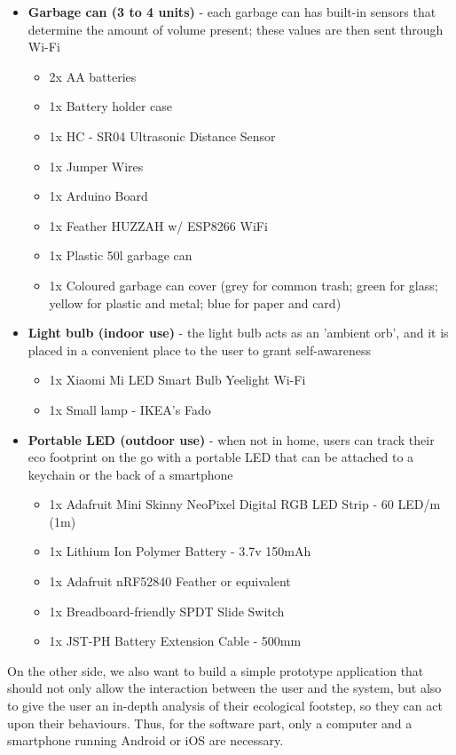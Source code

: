 \documentclass{sigchi-ext}
\begin{document}
\begin{itemize}
	\item \textbf{Garbage can (3 to 4 units)} - each garbage can has built-in sensors that determine the amount of volume present; these values are then sent through Wi-Fi
	\begin{itemize}
		\item 2x AA batteries
		\item 1x Battery holder case
		\item 1x HC - SR04 Ultrasonic Distance Sensor
		\item 1x Jumper Wires
		\item 1x Arduino Board
		\item 1x Feather HUZZAH w/ ESP8266 WiFi
		\item 1x Plastic 50l garbage can
		\item 1x Coloured garbage can cover (grey for common trash; green for glass; yellow for plastic and metal; blue for paper and card)
	\end{itemize}
	\item \textbf{Light bulb (indoor use)} - the light bulb acts as an 'ambient orb', and it is placed in a convenient place to the user to grant self-awareness
	\begin{itemize}
		\item 1x Xiaomi Mi LED Smart Bulb Yeelight Wi-Fi
		\item 1x Small lamp - IKEA's Fado
	\end{itemize}
	\item \textbf{Portable LED (outdoor use)} - when not in home, users can track their eco footprint on the go with a portable LED that can be attached to a keychain or the back of a smartphone
	\begin{itemize}
		\item 1x Adafruit Mini Skinny NeoPixel Digital RGB LED Strip - 60 LED/m (1m)
		\item 1x Lithium Ion Polymer Battery - 3.7v 150mAh
		\item 1x Adafruit nRF52840 Feather or equivalent
		\item 1x Breadboard-friendly SPDT Slide Switch
		\item 1x JST-PH Battery Extension Cable - 500mm
	\end{itemize}
\end{itemize}

On the other side, we also want to build a simple prototype application that should not only allow the interaction between the user and the system, but also to give the user an in-depth analysis of their ecological footstep, so they can act upon their behaviours. Thus, for the software part, only a computer and a smartphone running Android or iOS are necessary.
\end{document}
